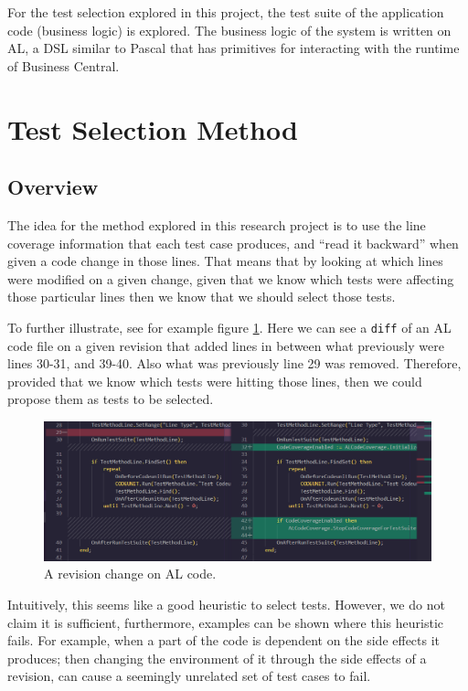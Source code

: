 \documentclass{article}
\begin{document}
   For the test selection explored in this project, the test suite of the application code (business logic) is explored. The business logic of the system is written on AL, a DSL similar to Pascal that has primitives for interacting with the runtime of Business Central.

\section{Test Selection Method}
\subsection{Overview}\label{section:overview}

The idea for the method explored in this research project is to use the line coverage information that each test case produces, and ``read it backward'' when given a code change in those lines. That means that by looking at which lines were modified on a given change, given that we know which tests were affecting those particular lines then we know that we should select those tests.

To further illustrate, see for example figure \ref{fig:diff}. Here we can see a \texttt{diff} of an AL code file on a given revision that added lines in between what previously were lines 30-31, and 39-40. Also what was previously line 29 was removed. Therefore, provided that we know which tests were hitting those lines, then we could propose them as tests to be selected.

\begin{figure}[H]
  \includegraphics[width=\textwidth]{images/diff.png}
  \caption{A revision change on AL code.}
  \label{fig:diff}
\end{figure}

Intuitively, this seems like a good heuristic to select tests. However, we do not claim it is sufficient, furthermore, examples can be shown where this heuristic fails. For example, when a part of the code is dependent on the side effects it produces; then changing the environment of it through the side effects of a revision, can cause a seemingly unrelated set of test cases to fail.
\end{document}
